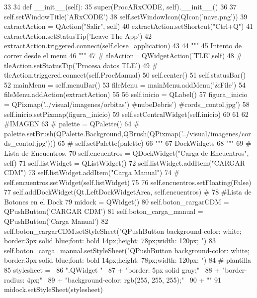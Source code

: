 \begin{DoxyCode}
33 
34     def __init__(self):
35         super(ProcARxCODE, self).__init__()
36         
37         self.setWindowTitle('ARxCODE')
38         self.setWindowIcon(QIcon('nave.png'))
39         extractAction = QAction("Salir", self)
40         extractAction.setShortcut("Ctrl+Q")
41         extractAction.setStatusTip('Leave The App')
42         extractAction.triggered.connect(self.close_application)
43         
44         """
45         Intento de correr desde el menu
46         """
47 #         tleAction= QWidgetAction('TLE',self)
48 #         tleAction.setStatusTip('Procesa datos TLE')
49 #         tleAction.triggered.connect(self.ProcManual)
50         self.center()
51         self.statusBar()
52         mainMenu = self.menuBar()
53         fileMenu = mainMenu.addMenu('&File')
54         fileMenu.addAction(extractAction)
55     
56         self.inicio = QLabel() 
57         figura_inicio = QPixmap('../visual/imagenes/orbitas') #nubeDebris')
       #cords_contol.jpg')
58         self.inicio.setPixmap(figura_inicio)
59         self.setCentralWidget(self.inicio)
60 
61         
62         #IMAGEN
63 #         palette    = QPalette()
64 #        
       palette.setBrush(QPalette.Background,QBrush(QPixmap('../visual/imagenes/cords_contol.jpg')))
65 #         self.setPalette(palette)
66         """
67         DockWidgets
68         """
69         # Lista de Encuentros.
70         self.encuentros = QDockWidget("Carga de Encuentros", self)
71         self.listWidget = QListWidget()
72         self.listWidget.addItem("CARGAR CDM")
73         self.listWidget.addItem("Carga Manual")
74 #        self.encuentros.setWidget(self.listWidget)
75 
76         self.encuentros.setFloating(False)
77         self.addDockWidget(Qt.LeftDockWidgetArea, self.encuentros) #
78         #Lista de Botones en el Dock
79         midock = QWidget()
80         self.boton_cargarCDM = QPushButton('CARGAR CDM')
81         self.boton_carga_manual = QPushButton('Carga Manual')
82         self.boton_cargarCDM.setStyleSheet("QPushButton { background-color:
       white; border:3px solid blue;font: bold 14px;height: 78px;width: 120px; }")
83         self.boton_carga_manual.setStyleSheet("QPushButton { background-color:
       white; border:3px solid blue;font: bold 14px;height: 78px;width: 120px; }")
84         # plantilla
85         stylesheet = \
86         ".QWidget {\n" \
87         + "border: 5px solid gray;\n" \
88         + "border-radius: 4px;\n" \
89         + "background-color: rgb(255, 255, 255);\n" \
90         + "}"
91         midock.setStyleSheet(stylesheet)

\end{DoxyCode}

